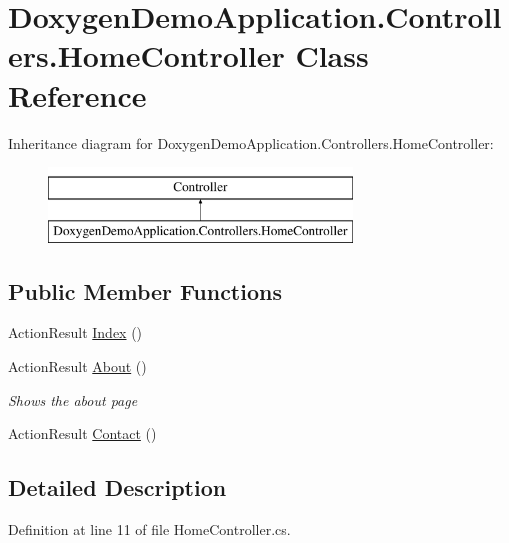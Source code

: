 \hypertarget{class_doxygen_demo_application_1_1_controllers_1_1_home_controller}{}\section{Doxygen\+Demo\+Application.\+Controllers.\+Home\+Controller Class Reference}
\label{class_doxygen_demo_application_1_1_controllers_1_1_home_controller}
Inheritance diagram for Doxygen\+Demo\+Application.\+Controllers.\+Home\+Controller\+:\begin{figure}[H]
\begin{center}
\leavevmode
\includegraphics[height=2.000000cm]{class_doxygen_demo_application_1_1_controllers_1_1_home_controller}
\end{center}
\end{figure}
\subsection*{Public Member Functions}
\begin{DoxyCompactItemize}
\item 
Action\+Result \mbox{\hyperlink{class_doxygen_demo_application_1_1_controllers_1_1_home_controller_a9c2494723fb0fbc42a3820972e2318c6}{Index}} ()
\item 
Action\+Result \mbox{\hyperlink{class_doxygen_demo_application_1_1_controllers_1_1_home_controller_a7d6893c8d902a9021181680621912c2a}{About}} ()
\begin{DoxyCompactList}\small\item\em Shows the about page \end{DoxyCompactList}\item 
Action\+Result \mbox{\hyperlink{class_doxygen_demo_application_1_1_controllers_1_1_home_controller_ad2c6cb519deb51651172035e0d4d8e06}{Contact}} ()
\end{DoxyCompactItemize}


\subsection{Detailed Description}


Definition at line 11 of file Home\+Controller.\+cs.



